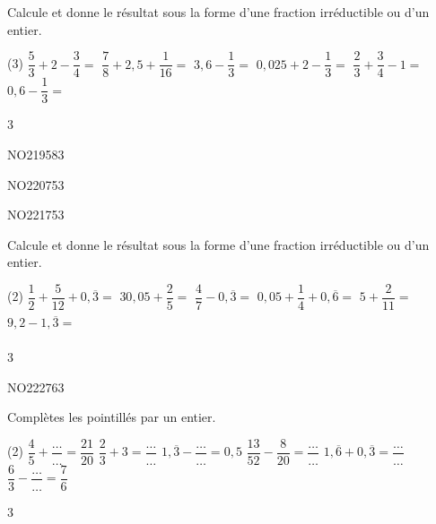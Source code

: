 \documentclass[a4paper,11pt]{report}
\begin{document}
\vfill

\newpage

\begin{exo}
 {Calcule et donne le résultat sous la forme d'une fraction irréductible ou d'un entier.
	 \begin{tasks}[after-item-skip=0.2em](3)
 \task  $\dfrac{5}{3}+2-\dfrac{3}{4}=$
 \task  $\dfrac{7}{8}+2,5+\dfrac{1}{16}=$
 \task $3,6-\dfrac{1}{3}=$
 \task  $0,025+2-\dfrac{1}{3}=$
 \task  $\dfrac{2}{3}+\dfrac{3}{4}-1=$
 \task $0,6-\dfrac{1}{3}=$
\end{tasks}
\vspace{-0.1cm}
}{3}
\end{exo}

\begin{exol}{NO219}{58}{3}
\end{exol}

\begin{exof}{NO220}{75}{3}
\end{exof}


\begin{exof}{NO221}{75}{3}
\end{exof}



\begin{exo}
{Calcule et donne le résultat sous la forme d'une fraction irréductible ou d'un entier.
	\begin{tasks}[after-item-skip=0.2em](2)
\task $\dfrac{1}{2}+\dfrac{5}{12}+0,\overline{3}=$
\task $30,05+\dfrac{2}{5}=$
\task $\dfrac{4}{7}-0,\overline{3}=$
\task $0,05+\dfrac{1}{4}+0,\overline{6}=$
\task $5+\dfrac{2}{11}=$
\task $9,2-1,\overline{3}=\phantom{\dfrac{1}{5}}$
\end{tasks}
\vspace{-0.2cm}
}
{3}
\end{exo}



\begin{exof}{NO222}{76}{3}
\end{exof}

\begin{exo}
{Complètes les pointillés par un entier.

\begin{tasks}[after-item-skip=0.2em](2)
\task  $\dfrac{4}{5}+\dfrac{\ldots}{\ldots}=\dfrac{21}{20}$
\task $\dfrac{2}{3}+3=\dfrac{\ldots}{\ldots}$
\task $1,\overline{3}-\dfrac{\ldots}{\ldots}=0,5$
\task  $\dfrac{13}{52}-\dfrac{8}{20}=\dfrac{\ldots}{\ldots}$
\task  $1,\overline{6}+0,\overline{3}=\dfrac{\ldots}{\ldots}\phantom{\dfrac{1}{2}}$
\task $\dfrac{6}{3}-\dfrac{\ldots}{\ldots}=\dfrac{7}{6}$
\end{tasks}
\vspace{-0.2cm}
}
{3}
\end{exo}
\end{document}

